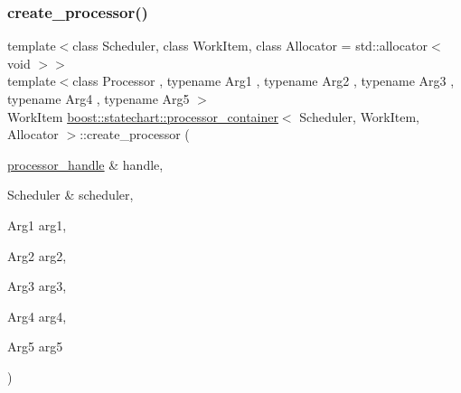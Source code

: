 \subsubsection{\texorpdfstring{create\+\_\+processor()}{create\_processor()}\hspace{0.1cm}{\footnotesize\ttfamily [6/7]}}
{\footnotesize\ttfamily template$<$class Scheduler, class Work\+Item, class Allocator = std\+::allocator$<$ void $>$$>$ \\
template$<$class Processor , typename Arg1 , typename Arg2 , typename Arg3 , typename Arg4 , typename Arg5 $>$ \\
Work\+Item \mbox{\hyperlink{classboost_1_1statechart_1_1processor__container}{boost\+::statechart\+::processor\+\_\+container}}$<$ Scheduler, Work\+Item, Allocator $>$\+::create\+\_\+processor (\begin{DoxyParamCaption}\item[{\mbox{\hyperlink{classboost_1_1statechart_1_1processor__container_a82ebbffaed81d7b99119ae0e892f6411}{processor\+\_\+handle}} \&}]{handle,  }\item[{Scheduler \&}]{scheduler,  }\item[{Arg1}]{arg1,  }\item[{Arg2}]{arg2,  }\item[{Arg3}]{arg3,  }\item[{Arg4}]{arg4,  }\item[{Arg5}]{arg5 }\end{DoxyParamCaption})\hspace{0.3cm}{\ttfamily [inline]}}

\mbox{\label{classboost_1_1statechart_1_1processor__container_afad33654a40929162fb4e10c9a9bc73b}} 
